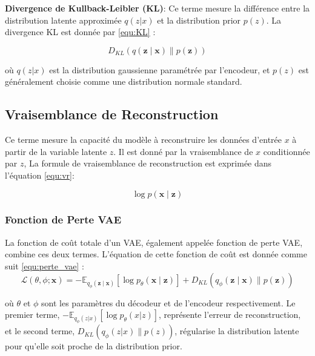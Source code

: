 \textbf{Divergence de Kullback-Leibler (KL)}: Ce terme mesure la différence entre la distribution latente approximée \( q(z | x) \) et la distribution prior \( p(z) \). La divergence KL est donnée par \ref{equ:KL} :

\begin{equation}
	D_{KL}(q(\mathbf{z} \mid \mathbf{x}) \parallel p(\mathbf{z}))
	\label{equ:KL}
\end{equation}

où \( q(z | x) \) est la distribution gaussienne paramétrée par l'encodeur, et
\( p(z) \) est généralement choisie comme une distribution normale standard.

\subsection*{Vraisemblance de Reconstruction}

Ce terme mesure la capacité du modèle à reconstruire les données d'entrée \( x
\) à partir de la variable latente \( z \). Il est donné par la vraisemblance
de \( x \) conditionnée par \( z \), La formule de vraisemblance de
reconstruction est exprimée dans l'équation \ref{equ:vr}:

\begin{equation}
	\log p(\mathbf{x} \mid \mathbf{z})
	\label{equ:vr}
\end{equation}

\subsubsection*{Fonction de Perte VAE}

La fonction de coût totale d'un VAE, également appelée fonction de perte VAE,
combine ces deux termes. L'équation de cette fonction de coût est donnée comme
suit \ref{equ:perte_vae} :
\begin{equation}
	\mathcal{L}(\theta, \phi; \mathbf{x}) = - \mathbb{E}_{q_\phi(\mathbf{z} \mid \mathbf{x})}[\log p_\theta(\mathbf{x} \mid \mathbf{z})] + D_{KL}(q_\phi(\mathbf{z} \mid \mathbf{x}) \parallel p(\mathbf{z}))
	\label{equ:perte_vae}
\end{equation}

où \( \theta \) et \( \phi \) sont les paramètres du décodeur et de l'encodeur
respectivement. Le premier terme, \( - \mathbb{E}_{q_\phi(z | x)}[\log
	p_\theta(x | z)] \), représente l'erreur de reconstruction, et le second terme,
\( D_{KL}(q_\phi(z | x) \parallel p(z)) \), régularise la distribution latente
pour qu'elle soit proche de la distribution prior.

